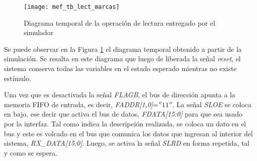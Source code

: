 %
%	
%
%
%
%
%		
%
%
%
%
%		

\begin{figure}[t]
	\centering
	\texttt{[image: mef\_tb\_lect\_marcas]}
	\caption{Diagrama temporal de la operación de lectura entregado por el simulador}
	\label{tb:lect}
\end{figure}

Se puede observar en la Figura \ref{tb:lect} el diagrama temporal obtenido a partir de la simulación. Se resalta en este diagrama que luego de liberada la señal \textit{reset}, el sistema conserva todas las variables en el estado esperado mientras no existe estímulo.

Una vez que es desactivada la señal {\it FLAGB}, el bus de dirección apunta a la memoria FIFO de entrada, es decir, {\it FADDR[1,0]}=$''11''$. La señal {\it SLOE} se coloca en bajo, ese decir que activa el bus de datos, {\it FDATA[15:0]} para que sea usado por la interfaz. Tal como indica la descripción realizada, se coloca un dato en el bus y este es volcado en el bus que comunica los datos que ingresan al interior del sistema, {\it RX\_DATA[15:0]}. Luego, se activa la señal {\it SLRD} en forma repetida, tal y como se espera.


